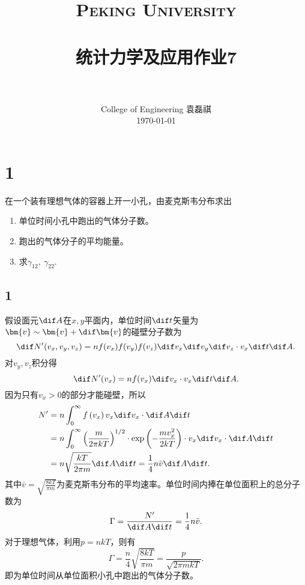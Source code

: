 \documentclass[12pt]{article}
\title{
		\vspace{-1in} 	
		\usefont{OT1}{bch}{b}{n}
		\normalfont \normalsize \textsc{\LARGE Peking University}\\[0.2cm] %
		\horrule{0.5pt} \\[0.2cm]
		\huge \bfseries{统计力学及应用作业7} \\[-0.2cm]
		\horrule{2pt} \\[0.2cm]
}
\author{
		\normalfont 								\normalsize
		College of Engineering \quad 2001111690  \quad 袁磊祺\\	\normalsize
        \today
}
\date{}
\begin{document}


\maketitle

\section{1}

在一个装有理想气体的容器上开一小孔，由麦克斯韦分布求出
\begin{enumerate}
	\item 单位时间小孔中跑出的气体分子数。
	\item 跑出的气体分子的平均能量。
	\item 求$\gamma_{12},\ \gamma_{22}$.
\end{enumerate}

\subsection{1}

假设面元$\dif A$在$x,y$平面内，单位时间$\dif t$矢量为$\bm{v}\sim \bm{v}+\dif \bm{v}$的碰壁分子数为
\begin{equation}
	\dif N'(v_x,v_y,v_z) = nf(v_x)f(v_y)f(v_z)\dif v_x \dif v_y \dif v_z \cdot v_x \dif t \dif A.
\end{equation}
对$v_y,v_z$积分得
\begin{equation}
	\dif N'(v_x) = nf(v_x)\dif v_x \cdot v_x \dif t \dif A.
\end{equation}
因为只有$v_x>0$的部分才能碰壁，所以
\begin{equation}
	\begin{aligned}
		N^{\prime} & =n \int_{0}^{\infty} f\left(v_{x}\right) v_{x} \dif v_{x} \cdot \dif A \dif t                                                                                \\
		           & =n \int_{0}^{\infty}\left(\frac{m}{2 \pi k T}\right)^{1 / 2} \cdot \exp \left(-\frac{m v_{x}^{2}}{2 k T}\right) \cdot v_{x} \dif v_{{x}} \cdot \dif A \dif t \\
		           & =n \sqrt{\frac{k T}{2 \pi m}} \dif A \dif t=\frac{1}{4} n \bar{v} \dif A \dif t.
	\end{aligned}
\end{equation}
其中$\bar{v}=\sqrt{\frac{8k T}{ \pi m}}$为麦克斯韦分布的平均速率。单位时间内捧在单位面积上的总分子数为
\begin{equation}
	\Gamma = \frac{N'}{\dif A \dif t} = \frac{1}{4}n\bar{v}.
\end{equation}
对于理想气体，利用$p=nkT$，则有
\begin{equation}
	\Gamma = \frac{n}{4} \sqrt{\frac{8k T}{ \pi m}}=\frac{p}{\sqrt{2\pi mkT}}.
\end{equation}
即为单位时间从单位面积小孔中跑出的气体分子数。
\end{document}
